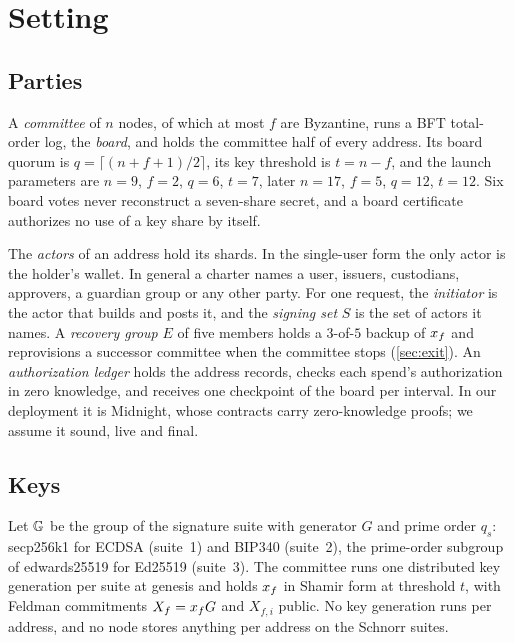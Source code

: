 \section{Setting}\label{sec:setting}

\subsection{Parties}\label{sec:parties}

A \emph{committee} of $n$ nodes, of which at most $f$ are Byzantine, runs a BFT total-order log, the \emph{board}, and holds the committee half of every address. Its board quorum is $q = \lceil (n+f+1)/2 \rceil$, its key threshold is $t = n - f$, and the launch parameters are $n = 9$, $f = 2$, $q = 6$, $t = 7$, later $n = 17$, $f = 5$, $q = 12$, $t = 12$. Six board votes never reconstruct a seven-share secret, and a board certificate authorizes no use of a key share by itself.

The \emph{actors} of an address hold its shards. In the single-user form the only actor is the holder's wallet. In general a charter names a user, issuers, custodians, approvers, a guardian group or any other party. For one request, the \emph{initiator} is the actor that builds and posts it, and the \emph{signing set} $S$ is the set of actors it names. A \emph{recovery group} $E$ of five members holds a $3$-of-$5$ backup of $x_{f}$ and reprovisions a successor committee when the committee stops (\cref{sec:exit}). An \emph{authorization ledger} holds the address records, checks each spend's authorization in zero knowledge, and receives one checkpoint of the board per interval. In our deployment it is Midnight, whose contracts carry zero-knowledge proofs; we assume it sound, live and final.

\subsection{Keys}\label{sec:keys}

Let $\mathbb{G}$ be the group of the signature suite with generator $G$ and prime order $q_s$: secp256k1 for ECDSA (suite~1) and BIP340 (suite~2), the prime-order subgroup of edwards25519 for Ed25519 (suite~3). The committee runs one distributed key generation per suite at genesis and holds $x_{f}$ in Shamir form at threshold $t$, with Feldman commitments $X_{f} = x_{f} G$ and $X_{f,i}$ public. No key generation runs per address, and no node stores anything per address on the Schnorr suites.

